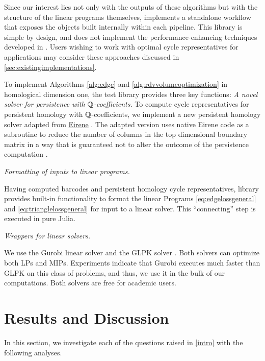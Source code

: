 Since our interest lies not only with the outputs of these algorithms but with the structure of the linear programs themselves, \cite{li_thompson} implements a standalone workflow that exposes the objects built internally within each pipeline.  This library is simple by design, and does not implement the performance-enhancing techniques  developed in \cite{Escolar2016, Obayashi2018}. Users wishing to work with optimal cycle representatives for applications may consider these approaches 
discussed in \se \ref{sec:existingimplementations}.


To implement  Algorithms \ref{alg:edge} and \ref{alg:rdvvolumeoptimization} in homological dimension one, the test library \cite{li_thompson} provides three key functions:  
\emph{A novel solver for persistence with $\mathbb{Q}$-coefficients.} To compute cycle representatives for persistent homology with $\mathbb{Q}$-coefficients, we implement a new persistent homology solver adapted from  \url{Eirene}  \cite{eirenecode}.  The adapted version uses native Eirene code as a subroutine to reduce the number of columns in the top dimensional boundary matrix in a way that is guaranteed not to alter the outcome of the persistence computation \cite{eirene}.

\noindent\emph{Formatting of inputs to linear programs.} 

Having computed barcodes and persistent homology cycle representatives, library \cite{li_thompson}  provides built-in functionality to format the linear Programs \eqref{eq:edgelossgeneral} and \eqref{eq:trianglelossgeneral} for input to a linear solver.  This ``connecting'' step is executed in pure Julia. 


\noindent \emph{Wrappers for linear solvers.} \label{linear solvers} 

We use the Gurobi linear solver \cite{gurobi} and the GLPK  solver \cite{glpk}. Both solvers can optimize both LPs and MIPs. Experiments indicate that Gurobi executes much faster than GLPK on this class of problems, and thus, we use it in the bulk of our computations. Both solvers are free for academic users. 

 
\section{Results and Discussion}\label{results}

 In this section, we investigate each of the questions raised in \se \ref{intro} with the following analyses.

